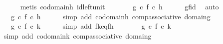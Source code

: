 \begin{isabellebody}
\ \ \ \ \isamarkupfalse%
\ {\isacharparenleft}{\kern0pt}metis\ codomain{\isacharunderscore}{\kern0pt}h\ id{\isacharunderscore}{\kern0pt}left{\isacharunderscore}{\kern0pt}unit{\isacharparenright}{\kern0pt}\isanewline
\ \ \isamarkupfalse%
\ \isamarkupfalse%
\ {\isachardoublequoteopen}{\isachardot}{\kern0pt}{\isachardot}{\kern0pt}{\isachardot}{\kern0pt}\ {\isacharequal}{\kern0pt}\ {\isacharparenleft}{\kern0pt}g\ {\isasymcirc}\isactrlsub c\ f{\isacharparenright}{\kern0pt}\ {\isasymcirc}\isactrlsub c\ h{\isachardoublequoteclose}\isanewline
\ \ \ \ \isamarkupfalse%
\ gf{\isacharunderscore}{\kern0pt}id\ \isamarkupfalse%
\ auto\isanewline
\ \ \isamarkupfalse%
\ \isamarkupfalse%
\ {\isachardoublequoteopen}{\isachardot}{\kern0pt}{\isachardot}{\kern0pt}{\isachardot}{\kern0pt}\ {\isacharequal}{\kern0pt}\ g\ {\isasymcirc}\isactrlsub c\ {\isacharparenleft}{\kern0pt}f\ {\isasymcirc}\isactrlsub c\ h{\isacharparenright}{\kern0pt}{\isachardoublequoteclose}\isanewline
\ \ \ \ \isamarkupfalse%
\ {\isacharparenleft}{\kern0pt}simp\ add{\isacharcolon}{\kern0pt}\ codomain{\isacharunderscore}{\kern0pt}h\ comp{\isacharunderscore}{\kern0pt}associative\ domain{\isacharunderscore}{\kern0pt}g{\isacharparenright}{\kern0pt}\isanewline
\ \ \isamarkupfalse%
\ \isamarkupfalse%
\ {\isachardoublequoteopen}{\isachardot}{\kern0pt}{\isachardot}{\kern0pt}{\isachardot}{\kern0pt}\ {\isacharequal}{\kern0pt}\ g\ {\isasymcirc}\isactrlsub c\ {\isacharparenleft}{\kern0pt}f\ {\isasymcirc}\isactrlsub c\ k{\isacharparenright}{\kern0pt}{\isachardoublequoteclose}\isanewline
\ \ \ \ \isamarkupfalse%
\ {\isacharparenleft}{\kern0pt}simp\ add{\isacharcolon}{\kern0pt}\ fk{\isacharunderscore}{\kern0pt}eq{\isacharunderscore}{\kern0pt}fh{\isacharparenright}{\kern0pt}\isanewline
\ \ \isamarkupfalse%
\ \isamarkupfalse%
\ {\isachardoublequoteopen}{\isachardot}{\kern0pt}{\isachardot}{\kern0pt}{\isachardot}{\kern0pt}\ {\isacharequal}{\kern0pt}\ {\isacharparenleft}{\kern0pt}g\ {\isasymcirc}\isactrlsub c\ f{\isacharparenright}{\kern0pt}\ {\isasymcirc}\isactrlsub c\ k{\isachardoublequoteclose}\isanewline
\ \ \ \ \isamarkupfalse%
\ {\isacharparenleft}{\kern0pt}simp\ add{\isacharcolon}{\kern0pt}\ codomain{\isacharunderscore}{\kern0pt}k\ comp{\isacharunderscore}{\kern0pt}associative\ domain{\isacharunderscore}{\kern0pt}g{\isacharparenright}{\kern0pt}\isanewline
\ \ \isamarkupfalse%
\ \isamarkupfalse%

\end{isabellebody}
